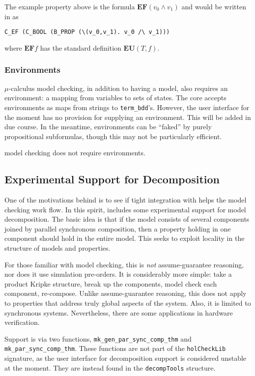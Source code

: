 The example property above is the \ctl formula \( \mathbf{EF} (v_0 \land v_1) \) and would be written in \HOL{} as

\verb+C_EF (C_BOOL (B_PROP (\(v_0,v_1). v_0 /\ v_1)))+

where \(\mathbf{EF} f\) has the standard definition \( \mathbf{EU}(T,f) \).

\subsubsection{Environments}

\(\mu\)-calculus model checking, in addition to having a model, also requires an environment: a mapping from variables to sets of states. The \hc{} core accepts environments as maps from strings to \texttt{term\_bdd}'s. However, the user interface for the moment has no provision for supplying an environment. This will be added in due course. In the meantime, environments can be ``faked'' by purely propositional subformulas, though this may not be particularly efficient.

\ctl model checking does not require environments.

\subsection{Experimental Support for Decomposition}\label{sec:decomp}

One of the motivations behind \hc{} is to see if tight integration with \HOL{} helps the model checking work flow. In this spirit, \hc{}  includes some experimental support for model decomposition. The basic idea is that if the model consists of several components joined by parallel synchronous composition, then a property holding in one component should hold in the entire model. This seeks to exploit locality in the structure of models and properties.

For those familiar with model checking, this is \emph{not} assume-guarantee reasoning, nor does it use simulation pre-orders. It is considerably more simple: take a product Kripke structure, break up the components, model check each component, re-compose. Unlike assume-guarantee reasoning, this does not apply to properties that address truly global aspects of the system. Also, it is limited to synchronous systems. Nevertheless, there are some applications in hardware verification.

Support is via two functions, \texttt{mk\_gen\_par\_sync\_comp\_thm} and \texttt{mk\_par\_sync\_comp\_thm}. These functions are not part of the \texttt{holCheckLib} signature, as the user interface for decomposition support is considered unstable at the moment. They are instead found in the \texttt{decompTools} structure.

